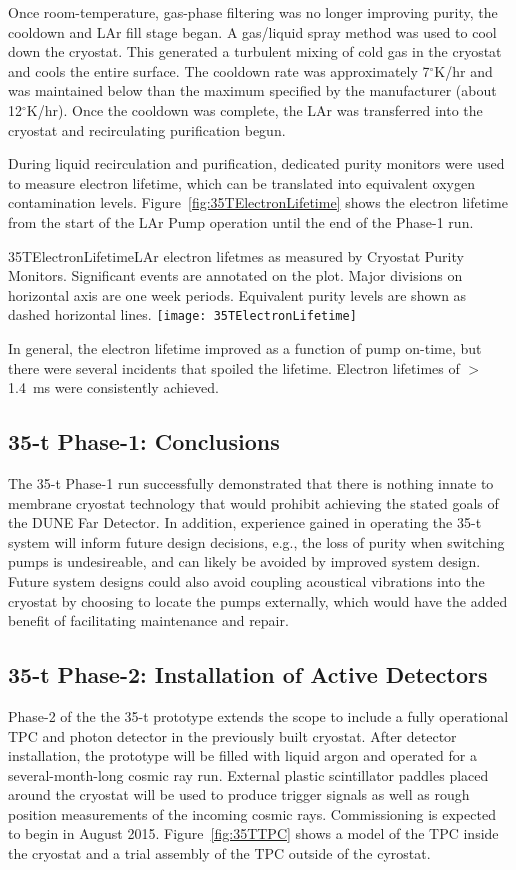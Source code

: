 Once room-temperature, gas-phase filtering was no longer improving
purity, the cooldown and LAr fill stage began.  A gas/liquid spray
method was used to cool down the cryostat.  This generated a turbulent
mixing of cold gas in the cryostat and cools the entire surface.  The
cooldown rate was approximately 7$^\circ$K/hr and was maintained below
than the maximum specified by the manufacturer (about 12$^\circ$K/hr).
Once the cooldown was complete, the LAr was transferred into the
cryostat and recirculating purification begun.

During liquid recirculation and purification, dedicated
purity monitors were used to measure electron lifetime, which can 
be translated into equivalent oxygen contamination levels.
Figure~\ref{fig:35TElectronLifetime} shows the electron lifetime from the start of the
LAr Pump operation until the end of the Phase-1 run. 
\begin{cdrfigure}{35TElectronLifetime}{LAr electron lifetmes as measured by 
Cryostat Purity Monitors. Significant events are annotated on the plot. Major divisions on horizontal axis 
are one week periods. Equivalent purity levels are shown as dashed horizontal lines.}
  \texttt{[image: 35TElectronLifetime]}
\end{cdrfigure}
In general, the electron lifetime improved as a function of pump 
on-time, but there were several incidents that spoiled the lifetime.
Electron lifetimes of $>$1.4~ms were consistently achieved.


\subsection{35-t Phase-1: Conclusions}
The 35-t Phase-1 run successfully demonstrated that there is nothing innate to
membrane cryostat technology that would prohibit achieving the stated goals of the
DUNE Far Detector. In addition, experience gained in operating the 35-t system
will inform future design decisions, e.g., the loss of purity when switching pumps is
undesireable, and can likely be avoided by improved system design. Future system
designs could also avoid coupling acoustical vibrations into the cryostat by choosing
to locate the pumps externally, which would have the added benefit of facilitating
maintenance and repair.

\subsection{35-t Phase-2: Installation of Active Detectors}
Phase-2 of the the 35-t prototype extends the scope to include a
fully operational TPC and photon detector in the previously built
cryostat.  After detector installation, the prototype will be filled
with liquid argon and operated for a several-month-long cosmic ray
run.  External plastic scintillator paddles placed around the cryostat
will be used to produce trigger signals as well as rough position
measurements of the incoming cosmic rays.  Commissioning is expected
to begin in August 2015.  Figure~\ref{fig:35TTPC} shows a model of the
TPC inside the cryostat and a trial assembly of the TPC outside of the
cyrostat.

